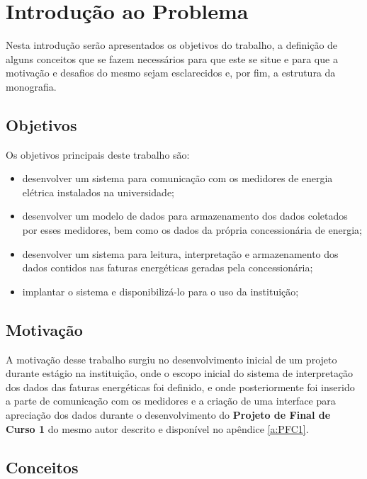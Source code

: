 \chapter[Introdução ao Problema]{Introdução ao Problema}

Nesta introdução serão apresentados os objetivos do trabalho, a definição de alguns conceitos que se fazem necessários para que este se situe e para que a motivação e desafios do mesmo sejam esclarecidos e, por fim, a estrutura da monografia.

\section{Objetivos}

Os objetivos principais deste trabalho são:

\begin{itemize}
    \item desenvolver um sistema para comunicação com os medidores de energia elétrica instalados na universidade;
    \item desenvolver um modelo de dados para armazenamento dos dados coletados por esses medidores, bem como os dados da própria concessionária de energia;
    \item desenvolver um sistema para leitura, interpretação e armazenamento dos dados contidos nas faturas energéticas geradas pela concessionária;
    \item implantar o sistema e disponibilizá-lo para o uso da instituição;
\end{itemize}

\section{Motivação}

A motivação desse trabalho surgiu no desenvolvimento inicial de um projeto durante estágio na instituição, onde o escopo inicial do sistema de interpretação dos dados das faturas energéticas foi definido, e onde posteriormente foi inserido a parte de comunicação com os medidores e a criação de uma interface para apreciação dos dados durante o desenvolvimento do \textbf{Projeto de Final de Curso 1} do mesmo autor descrito e disponível no apêndice \ref{a:PFC1}.

\section{Conceitos}

